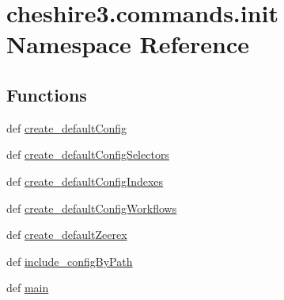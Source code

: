 \hypertarget{namespacecheshire3_1_1commands_1_1init}{\section{cheshire3.\-commands.\-init Namespace Reference}
\label{namespacecheshire3_1_1commands_1_1init}
}
\subsection*{Functions}
\begin{DoxyCompactItemize}
\item 
def \hyperlink{namespacecheshire3_1_1commands_1_1init_a5648df37e76ccbc3a8e497c56e96c4d9}{create\-\_\-default\-Config}
\item 
def \hyperlink{namespacecheshire3_1_1commands_1_1init_acada7aa48af66e7cc80149258784ceeb}{create\-\_\-default\-Config\-Selectors}
\item 
def \hyperlink{namespacecheshire3_1_1commands_1_1init_a2cd76f256169b525448ff6baa19e1d6a}{create\-\_\-default\-Config\-Indexes}
\item 
def \hyperlink{namespacecheshire3_1_1commands_1_1init_aa82843f3245d06d6fd2c3575e703c313}{create\-\_\-default\-Config\-Workflows}
\item 
def \hyperlink{namespacecheshire3_1_1commands_1_1init_a32bd4d664ffcbf95baeed62611ef3b4e}{create\-\_\-default\-Zeerex}
\item 
def \hyperlink{namespacecheshire3_1_1commands_1_1init_a4a2c893731c45cccb81aec3a51ff7a2b}{include\-\_\-config\-By\-Path}
\item 
def \hyperlink{namespacecheshire3_1_1commands_1_1init_a7019f60921e43738f4f0e432fa0218d5}{main}
\end{DoxyCompactItemize}
